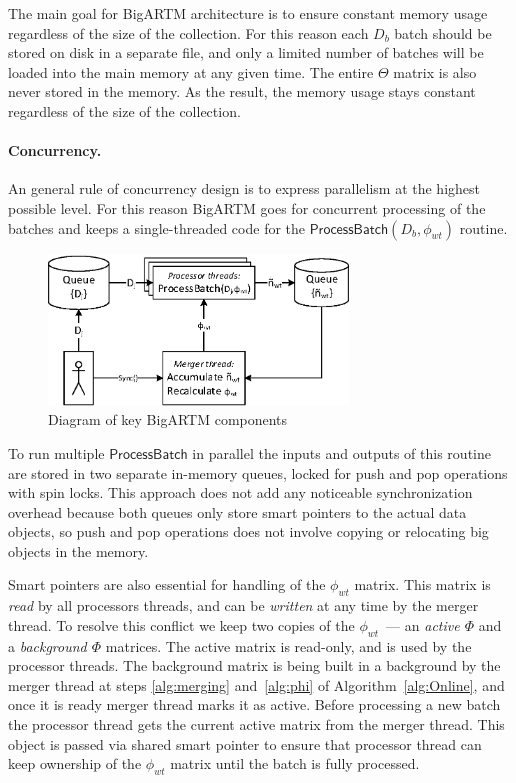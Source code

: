\documentclass{llncs}
\newcommand{\kw}[1]{\textsf{#1}}
\begin{document}
The main goal for BigARTM architecture is to ensure constant memory usage regardless of the size of the collection.
For this reason each $D_b$ batch should be stored on disk in a separate file,
and only a limited number of batches will be loaded into the main memory at any given time.
The entire $\Theta$ matrix is also never stored in the memory.
As the result, the memory usage stays constant regardless of the size of the collection.

\paragraph{Concurrency.}
An general rule of concurrency design is to express parallelism at the highest possible level.
For this reason BigARTM goes for concurrent processing of the batches
and keeps a single-threaded code for the $\kw{ProcessBatch}(D_b, \phi_{wt})$ routine.

\begin{figure}[h!]
\begin{centering}
\includegraphics[height=40mm]{diagramm_artm_core.eps}
\caption{Diagram of key BigARTM components}
\label{fig:diagramm_artm_core}
\end{centering}
\end{figure}

To run multiple $\kw{ProcessBatch}$ in parallel the inputs and outputs of this routine are stored in two separate in-memory queues,
locked for push and pop operations with spin locks.
This approach does not add any noticeable synchronization overhead because
both queues only store smart pointers to the actual data objects,
so push and pop operations does not involve copying or relocating big objects in the memory.

Smart pointers are also essential for handling of the $\phi_{wt}$ matrix.
This matrix is \emph{read} by all processors threads, and can be \emph{written} at any time by the merger thread.
To resolve this conflict we keep two copies of the $\phi_{wt}$~--- an \emph{active $\Phi$} and a \emph{background $\Phi$} matrices.
The active matrix is read-only, and is used by the processor threads.
The background matrix is being built in a background by the merger thread
at steps \ref{alg:merging} and~\ref{alg:phi} of Algorithm~\ref{alg:Online},
and once it is ready merger thread marks it as active.
Before processing a new batch the processor thread gets the current active matrix from the merger thread.
This object is passed via shared smart pointer to ensure that processor thread can keep ownership of the $\phi_{wt}$ matrix
until the batch is fully processed.
\end{document}
